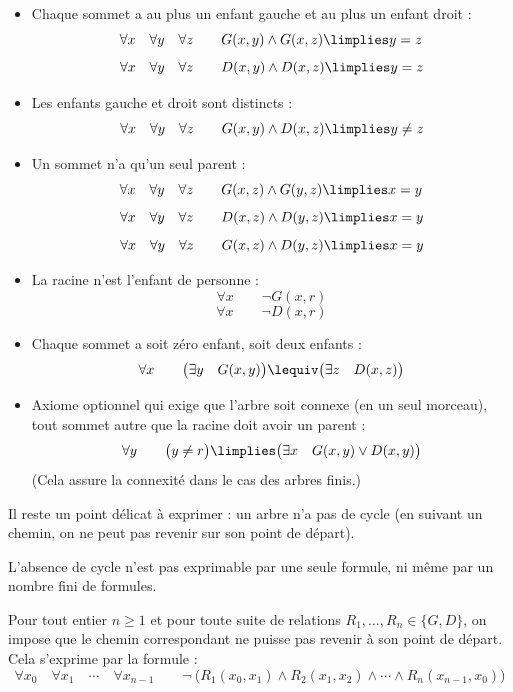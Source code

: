\documentclass[11pt,class=report,crop=false]{standalone}
\begin{document}
\begin{itemize}
	\item Chaque sommet a au plus un enfant gauche et au plus un enfant droit :
	\[
	\forall x \quad \forall y \quad \forall z \qquad
	 G(x,y) \land G(x,z) \limplies y=z 
	\]
	\[
	\forall x \quad \forall y \quad \forall z \qquad
	 D(x,y) \land D(x,z) \limplies y=z 
	\]	
	
	

	\item Les enfants gauche et droit sont distincts :
	\[
	\forall x \quad \forall y\quad \forall z\qquad
	G(x,y)\land D(x,z) \limplies  y\neq z 
	\]
	
	
	\item Un sommet n'a qu'un seul parent :
	\[
	\forall x \quad \forall y\quad \forall z\qquad
	G(x,z)\land G(y,z) \limplies  x = y 
	\]
	\[
	\forall x \quad \forall y\quad \forall z\qquad
	D(x,z)\land D(y,z) \limplies  x = y 
	\]
	\[
	\forall x \quad \forall y \quad \forall z \qquad
	G(x,z) \land D(y,z) \limplies x = y
	\]	
	
	\item La racine n'est l'enfant de personne :
	\[
	\forall x\qquad \lnot G(x,r)
	\]
	\[
	\forall x\qquad \lnot D(x,r)
	\]	
	
	\item Chaque sommet a soit zéro enfant, soit deux enfants :
	\[
	\forall x \qquad \big( \exists y \quad  G(x,y) \big) \lequiv \big(\exists z\quad D(x,z)\big)
	\]
	 
	
	\item Axiome optionnel qui exige que l'arbre soit connexe (en un seul morceau), tout sommet autre que la racine doit avoir un parent :
	\[
	\forall y \qquad \big( y \neq r \big) \limplies \big( \exists x \quad G(x,y) \lor D(x,y) \big)
	\]
	(Cela assure la connexité dans le cas des arbres finis.)
\end{itemize}

\medskip


Il reste un point délicat à exprimer : un arbre n'a pas de cycle (en suivant un chemin, on ne peut pas revenir sur son point de départ).




L'absence de cycle n'est pas exprimable par une seule formule, ni même par un nombre fini de formules.

Pour tout entier $n\ge1$ et pour toute suite de relations
$R_1,\dots,R_n\in\{G,D\}$, on impose que le chemin correspondant ne puisse pas revenir à son point de départ. Cela s'exprime par la formule :
\[
\forall x_0 \quad \forall x_1 \quad \cdots \quad \forall x_{n-1} 
\qquad
\lnot \ \Big(
R_1(x_0,x_1) \land R_2(x_1,x_2) \land \cdots \land R_n(x_{n-1},x_0) 
\Big)
\]
\end{document}
